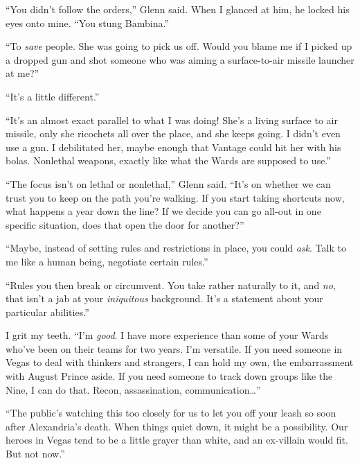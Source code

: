 ``You didn't follow the orders,'' Glenn said.  When I glanced at him, he locked his eyes onto mine.  ``You stung Bambina.''



``To \emph{save} people.  She was going to pick us off.  Would you blame me if I picked up a dropped gun and shot someone who was aiming a surface-to-air missile launcher at me?''



``It's a little different.''



``It's an almost exact parallel to what I was doing!  She's a living surface to air missile, only she ricochets all over the place, and she keeps going.  I didn't even use a gun.  I debilitated her, maybe enough that Vantage could hit her with his bolas.  Nonlethal weapons, exactly like what the Wards are supposed to use.''



``The focus isn't on lethal or nonlethal,'' Glenn said.  ``It's on whether we can trust you to keep on the path you're walking.  If you start taking shortcuts now, what happens a year down the line?  If we decide you can go all-out in one specific situation, does that open the door for another?''



``Maybe, instead of setting rules and restrictions in place, you could \emph{ask}.  Talk to me like a human being, negotiate certain rules.''



``Rules you then break or circumvent.  You take rather naturally to it, and \emph{no}, that isn't a jab at your \emph{iniquitous} background\emph{.  }It's a statement about your particular abilities.''



I grit my teeth.  ``I'm \emph{good}.  I have more experience than some of your Wards who've been on their teams for two years.  I'm versatile.  If you need someone in Vegas to deal with thinkers and strangers, I can hold my own, the embarrassment with August Prince aside.  If you need someone to track down groups like the Nine, I can do that.  Recon, assassination, communication\ldots''



``The public's watching this too closely for us to let you off your leash so soon after Alexandria's death.  When things quiet down, it might be a possibility.  Our heroes in Vegas tend to be a little grayer than white, and an ex-villain would fit.  But not now.''



